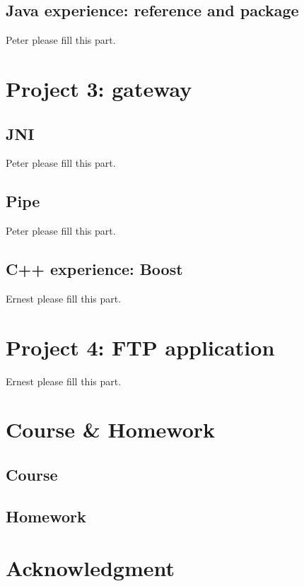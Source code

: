 \documentclass[conference,compsoc]{IEEEtran}
\begin{document}
	\subsection{Java experience: reference and package}
		Peter please fill this part.

\section{Project 3: gateway}
	
	\subsection{JNI}
		Peter please fill this part.
	
	\subsection{Pipe}
		Peter please fill this part.
	
	\subsection{C++ experience: Boost}
		Ernest please fill this part.

\section{Project 4: FTP application}
	Ernest please fill this part.

\section{Course \& Homework}
	
	\subsection{Course}
	
	\subsection{Homework}

\section*{Acknowledgment}





\end{document}
